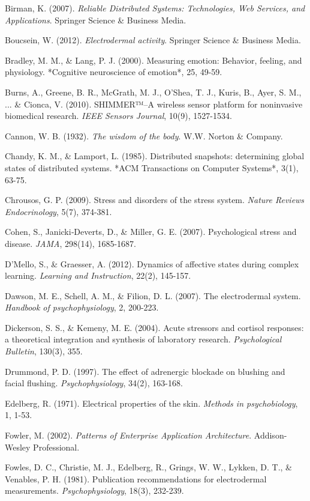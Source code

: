 \documentclass[11pt,a4paper]{article}
\begin{document}
Birman, K. (2007). \textit{Reliable Distributed Systems: Technologies, Web Services, and Applications}. Springer Science \&
Business Media.

Boucsein, W. (2012). \textit{Electrodermal activity}. Springer Science \& Business Media.

Bradley, M. M., \& Lang, P. J. (2000). Measuring emotion: Behavior, feeling, and physiology. *Cognitive neuroscience of
emotion*, 25, 49-59.

Burns, A., Greene, B. R., McGrath, M. J., O'Shea, T. J., Kuris, B., Ayer, S. M., ... \& Cionca, V. (2010). SHIMMER™–A
wireless sensor platform for noninvasive biomedical research. \textit{IEEE Sensors Journal}, 10(9), 1527-1534.

Cannon, W. B. (1932). \textit{The wisdom of the body}. W.W. Norton \& Company.

Chandy, K. M., \& Lamport, L. (1985). Distributed snapshots: determining global states of distributed systems. *ACM
Transactions on Computer Systems*, 3(1), 63-75.

Chrousos, G. P. (2009). Stress and disorders of the stress system. \textit{Nature Reviews Endocrinology}, 5(7), 374-381.

Cohen, S., Janicki‐Deverts, D., \& Miller, G. E. (2007). Psychological stress and disease. \textit{JAMA}, 298(14), 1685-1687.

D'Mello, S., \& Graesser, A. (2012). Dynamics of affective states during complex learning. \textit{Learning and Instruction},
22(2), 145-157.

Dawson, M. E., Schell, A. M., \& Filion, D. L. (2007). The electrodermal system. \textit{Handbook of psychophysiology}, 2,
200-223.

Dickerson, S. S., \& Kemeny, M. E. (2004). Acute stressors and cortisol responses: a theoretical integration and
synthesis of laboratory research. \textit{Psychological Bulletin}, 130(3), 355.

Drummond, P. D. (1997). The effect of adrenergic blockade on blushing and facial flushing. \textit{Psychophysiology}, 34(2),
163-168.

Edelberg, R. (1971). Electrical properties of the skin. \textit{Methods in psychobiology}, 1, 1-53.

Fowler, M. (2002). \textit{Patterns of Enterprise Application Architecture}. Addison-Wesley Professional.

Fowles, D. C., Christie, M. J., Edelberg, R., Grings, W. W., Lykken, D. T., \& Venables, P. H. (1981). Publication
recommendations for electrodermal measurements. \textit{Psychophysiology}, 18(3), 232-239.
\end{document}
